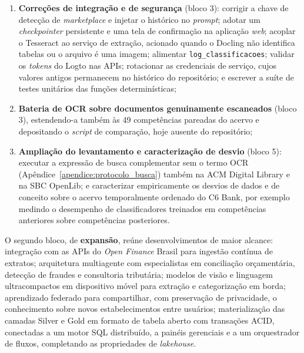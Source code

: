 \begin{enumerate}
	\item \textbf{Correções de integração e de segurança} (bloco 3): corrigir a chave de detecção de \textit{marketplace} e injetar o histórico no \textit{prompt}; adotar um \textit{checkpointer} persistente e uma tela de confirmação na aplicação \textit{web}; acoplar o Tesseract ao serviço de extração, acionado quando o Docling não identifica tabelas ou o arquivo é uma imagem; alimentar \texttt{log\_classificacoes}; validar os \textit{tokens} do Logto nas APIs; rotacionar as credenciais de serviço, cujos valores antigos permanecem no histórico do repositório; e escrever a suíte de testes unitários das funções determinísticas;
	\item \textbf{Bateria de OCR sobre documentos genuinamente escaneados} (bloco 3), estendendo-a também às 49 competências pareadas do acervo e depositando o \textit{script} de comparação, hoje ausente do repositório;
	\item \textbf{Ampliação do levantamento e caracterização de desvio} (bloco 5): executar a expressão de busca complementar sem o termo OCR (Apêndice~\ref{apendice:protocolo_busca}) também na ACM Digital Library e na SBC OpenLib; e caracterizar empiricamente os desvios de dados e de conceito sobre o acervo temporalmente ordenado do C6 Bank, por exemplo medindo o desempenho de classificadores treinados em competências anteriores sobre competências posteriores.
\end{enumerate}

O segundo bloco, de \textbf{expansão}, reúne desenvolvimentos de maior alcance: integração com as APIs do \textit{Open Finance} Brasil para ingestão contínua de extratos; arquitetura multiagente com especialistas em conciliação orçamentária, detecção de fraudes e consultoria tributária; modelos de visão e linguagem ultracompactos em dispositivo móvel para extração e categorização em borda; aprendizado federado para compartilhar, com preservação de privacidade, o conhecimento sobre novos estabelecimentos entre usuários; materialização das camadas Silver e Gold em formato de tabela aberto com transações ACID, conectadas a um motor SQL distribuído, a painéis gerenciais e a um orquestrador de fluxos, completando as propriedades de \textit{lakehouse}.

